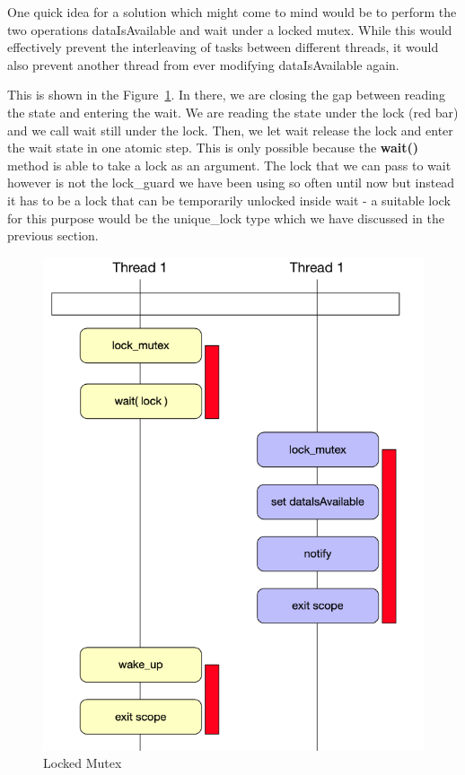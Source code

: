 \documentclass[11pt, a4paper]{article}
\begin{document}
One quick idea for a solution which might come to mind would be to perform the two operations dataIsAvailable and wait under a locked mutex. While this would effectively prevent the interleaving of tasks between different threads, it would also prevent another thread from ever modifying dataIsAvailable again.



This is shown in the Figure~\ref{fig:locked_mutex}. In there, we are closing the gap between reading the state and entering the wait. We are reading the state under the lock (red bar) and we call wait still under the lock. Then, we let wait release the lock and enter the wait state in one atomic step. This is only possible because the \textbf{wait()} method is able to take a lock as an argument. The lock that we can pass to wait however is not the lock\_guard we have been using so often until now but instead it has to be a lock that can be temporarily unlocked inside wait - a suitable lock for this purpose would be the unique\_lock type which we have discussed in the previous section.


\begin{figure}[htpb!]
	\centering
	\includegraphics[width=0.8\linewidth]{locked_mutex}
	\caption{Locked Mutex}
	\label{fig:locked_mutex}
\end{figure}
\end{document}
